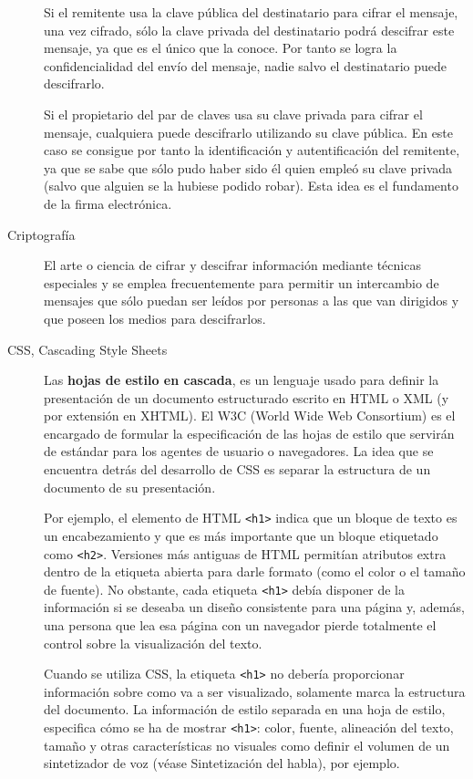 \begin{description}
Si el remitente usa la clave pública del destinatario para cifrar el mensaje, una vez cifrado, sólo la clave privada del destinatario podrá descifrar este mensaje, ya que es el único que la conoce. Por tanto se logra la confidencialidad del envío del mensaje, nadie salvo el destinatario puede descifrarlo.

Si el propietario del par de claves usa su clave privada para cifrar el mensaje, cualquiera puede descifrarlo utilizando su clave pública. En este caso se consigue por tanto la identificación y autentificación del remitente, ya que se sabe que sólo pudo haber sido él quien empleó su clave privada (salvo que alguien se la hubiese podido robar). Esta idea es el fundamento de la firma electrónica.

\item[Criptografía]
El arte o ciencia de cifrar y descifrar información  mediante técnicas especiales y se emplea frecuentemente para permitir un intercambio de mensajes que sólo puedan ser leídos por personas a las que van dirigidos y que poseen los medios para descifrarlos.

\item[CSS, Cascading Style Sheets]
Las \textbf{hojas de estilo en cascada}, es un lenguaje usado para definir la presentación de un documento estructurado escrito en HTML o XML (y por extensión en XHTML). El W3C (World Wide Web Consortium) es el encargado de formular la especificación de las hojas de estilo que servirán de estándar para los agentes de usuario o navegadores. La idea que se encuentra detrás del desarrollo de CSS es separar la estructura de un documento de su presentación.

Por ejemplo, el elemento de HTML \verb|<h1>| indica que un bloque de texto es un encabezamiento y que es más importante que un bloque etiquetado como \verb|<h2>|. Versiones más antiguas de HTML permitían atributos extra dentro de la etiqueta abierta para darle formato (como el color o el tamaño de fuente). No obstante, cada etiqueta \verb|<h1>| debía disponer de la información si se deseaba un diseño consistente para una página y, además, una persona que lea esa página con un navegador pierde totalmente el control sobre la visualización del texto.

Cuando se utiliza CSS, la etiqueta \verb|<h1>| no debería proporcionar información sobre como va a ser visualizado, solamente marca la estructura del documento. La información de estilo separada en una hoja de estilo, especifica cómo se ha de mostrar \verb|<h1>|: color, fuente, alineación del texto, tamaño y otras características no visuales como definir el volumen de un sintetizador de voz (véase Sintetización del habla), por ejemplo.


\end{description}
